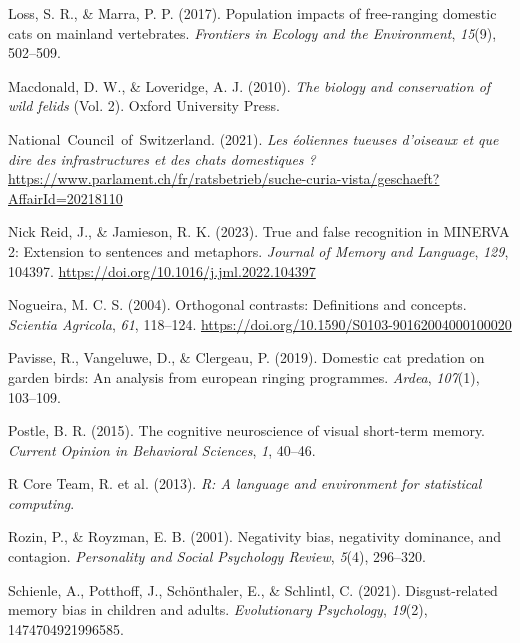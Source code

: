 \documentclass[
  man,
  longtable,
  nolmodern,
  notxfonts,
  notimes,
  colorlinks=true,linkcolor=blue,citecolor=blue,urlcolor=blue]{apa7}
\newlength{\cslhangindent}
\newenvironment{CSLReferences}[2] %
 {\begin{list}{}{%
  \setlength{\itemindent}{0pt}
  \setlength{\leftmargin}{0pt}
  \setlength{\parsep}{0pt}
  \ifodd #1
   \setlength{\leftmargin}{\cslhangindent}
   \setlength{\itemindent}{-1\cslhangindent}
  \fi
  \setlength{\itemsep}{#2\baselineskip}}}
 {\end{list}}
\begin{document}
\begin{CSLReferences}{1}{0}
Loss, S. R., \& Marra, P. P. (2017). Population impacts of free-ranging
domestic cats on mainland vertebrates. \emph{Frontiers in Ecology and
the Environment}, \emph{15}(9), 502--509.

Macdonald, D. W., \& Loveridge, A. J. (2010). \emph{The biology and
conservation of wild felids} (Vol. 2). Oxford University Press.

National~Council~of~Switzerland. (2021). \emph{Les éoliennes tueuses
d'oiseaux et que dire des infrastructures et des chats domestiques ?}
\url{https://www.parlament.ch/fr/ratsbetrieb/suche-curia-vista/geschaeft?AffairId=20218110}

Nick Reid, J., \& Jamieson, R. K. (2023). True and false recognition in
{MINERVA} 2: {Extension} to sentences and metaphors. \emph{Journal of
Memory and Language}, \emph{129}, 104397.
\url{https://doi.org/10.1016/j.jml.2022.104397}

Nogueira, M. C. S. (2004). Orthogonal contrasts: Definitions and
concepts. \emph{Scientia Agricola}, \emph{61}, 118--124.
\url{https://doi.org/10.1590/S0103-90162004000100020}

Pavisse, R., Vangeluwe, D., \& Clergeau, P. (2019). Domestic cat
predation on garden birds: An analysis from european ringing programmes.
\emph{Ardea}, \emph{107}(1), 103--109.

Postle, B. R. (2015). The cognitive neuroscience of visual short-term
memory. \emph{Current Opinion in Behavioral Sciences}, \emph{1}, 40--46.

R Core Team, R. et al. (2013). \emph{R: {A} language and environment for
statistical computing}.

Rozin, P., \& Royzman, E. B. (2001). Negativity bias, negativity
dominance, and contagion. \emph{Personality and Social Psychology
Review}, \emph{5}(4), 296--320.

Schienle, A., Potthoff, J., Schönthaler, E., \& Schlintl, C. (2021).
Disgust-related memory bias in children and adults. \emph{Evolutionary
Psychology}, \emph{19}(2), 1474704921996585.


\end{CSLReferences}
\end{document}
